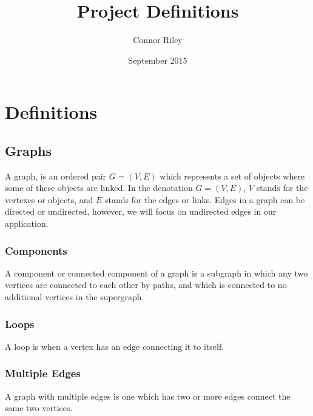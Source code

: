 \documentclass{article}
\title{Project Definitions}
\author{Connor Riley }
\date{September 2015}
\begin{document}
\maketitle


\section{Definitions}
\subsection{Graphs}
A graph, is an ordered pair $G=(V,E)$ which represents a set of objects where some of these objects are linked. In the denotation $G=(V,E)$, $V$ stands for the vertexes or objects, and $E$ stands for the edges or links. Edges in a graph can be directed or undirected, however, we will focus on undirected edges in our application.
\subsubsection{Components}
A component or connected component of a graph is a subgraph in which any two vertices are connected to each other by paths, and which is connected to no additional vertices in the supergraph.
\subsubsection{Loops}
A loop is when a vertex has an edge connecting it to itself. \citep{NIST:self-loop}
\begin{center}
\end{center}
\subsubsection{Multiple Edges}
A graph with multiple edges is one which has two or more edges connect the same two vertices.
\begin{center}
\end{center}
\end{document}
